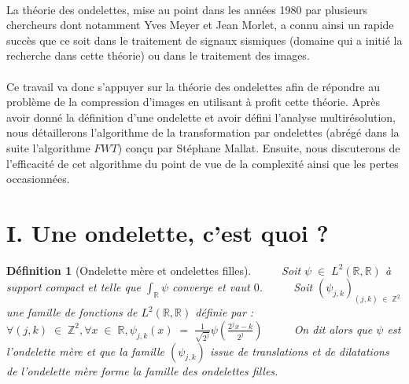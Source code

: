 \documentclass[a4paper,10pt]{report}
\theoremstyle{break}
\newtheorem{Def}{D\'{e}finition}
\begin{document}
  \paragraph{} La th\'{e}orie des ondelettes, mise au point dans les ann\'{e}es 1980 par plusieurs chercheurs dont notamment Yves Meyer
    et Jean Morlet, a connu ainsi un rapide succ\`{e}s que ce soit dans le traitement de signaux sismiques (domaine qui a initi\'{e}
    la recherche dans cette th\'{e}orie) ou dans le traitement des images.
      
      
  \paragraph{} Ce travail va donc s'appuyer sur la th\'{e}orie des ondelettes afin de r\'{e}pondre au probl\`{e}me de la compression
      d'images en utilisant \`{a} profit cette th\'{e}orie. Apr\`{e}s avoir donn\'{e} la d\'{e}finition d'une ondelette et avoir 
      d\'{e}fini l'analyse multir\'{e}solution, nous d\'{e}taillerons l'algorithme de la transformation par ondelettes 
      (abr\'{e}g\'{e} dans la suite l'algorithme $FWT$) con{\c c}u par St\'{e}phane Mallat. 
      Ensuite, nous discuterons de l'efficacit\'{e} de cet algorithme du point de vue de la complexit\'{e} ainsi que les pertes occasionn\'{e}es. \newline

\newpage

  \section{I. Une ondelette, c'est quoi ?}
    
    \begin{Def}[Ondelette m\`{e}re et ondelettes filles]
	$\phantom{Prop}$ Soit $\psi \; \in \; L^2(\mathbb{R},\mathbb{R})$ \`{a} support compact et telle que 
	      $ \int_{\mathbb{R}} \psi $ converge et vaut $ 0 $. \newline
	$\phantom{Prop}$ Soit $ (\psi_{j,k})_{ (j, k) \; \in \; \mathbb{Z}^2 } $ une famille de fonctions de $L^2(\mathbb{R},\mathbb{R})$ d\'{e}finie par : \newline
	$\phantom{Soit \psi \; \in \; L^2(R,R)}$ $ \forall (j, k) \; \in \; \mathbb{Z}^2, \forall x \; \in \; \mathbb{R}, 
	      \psi_{j,k}(x) \; = \; \frac{1}{\sqrt{2^j}} \psi (\frac{2^j x - k}{2^j})$ \newline
	$\phantom{Prop}$ On dit alors que $\psi$ est l'ondelette m\`{e}re \cite{twt} et que la famille $ (\psi_{j,k}) $ issue de translations et de dilatations
	    de l'ondelette m\`{e}re forme la famille des ondelettes filles.
    \end{Def}
	    
\end{document}
